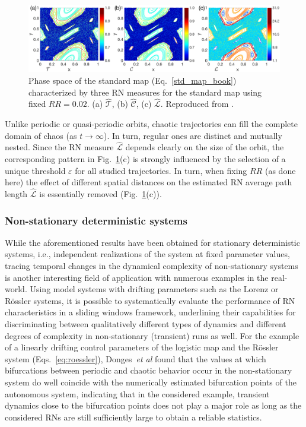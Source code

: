 \begin{figure}
	\centering
	\includegraphics[width=\columnwidth]{Chapter03_RecurrenceNt/stdFixedRRP.eps}
\caption{\small {Phase space of the standard map (Eq.~\ref{std_map_book}) characterized by three RN measures for the standard map using fixed $RR=0.02$. (a) $\hat{\mathcal{T}}$, (b) $\hat{\mathcal{C}}$, (c) $\hat{\mathcal{L}}$. Reproduced from \cite{Zou2016d}. } \label{fig:sm_rec_rr}}
\end{figure}

Unlike periodic or quasi-periodic orbits, chaotic trajectories can fill the complete domain of chaos (as $t\to\infty$). In turn, regular ones are distinct and mutually nested. Since the RN measure $\hat{\mathcal{L}}$ depends clearly on the size of the orbit, the corresponding pattern in Fig.~\ref{fig:sm_rec_rr}(c) is strongly influenced by the selection of a unique threshold $\varepsilon$ for all studied trajectories. In turn, when fixing $RR$ (as done here) the effect of different spatial distances on the estimated RN average path length $\hat{\mathcal{L}}$ is essentially removed (Fig.~\ref{fig:sm_rec_rr}(c)).


		\subsubsection{Non-stationary deterministic systems} \label{subsubsec:nonstation}
		While the aforementioned results have been obtained for stationary deterministic systems, i.e., independent realizations of the system at fixed parameter values, tracing temporal changes in the dynamical complexity of non-stationary systems is another interesting field of application with numerous examples in the real-world. Using model systems with drifting parameters such as the Lorenz \cite{Donges2011} or R\"ossler systems, it is possible to systematically evaluate the performance of RN characteristics in a sliding windows framework, underlining their capabilities for discriminating between qualitatively different types of dynamics and different degrees of complexity in non-stationary (transient) runs as well. For the example of a linearly drifting control parameters of the logistic map and the R\"ossler system (Eqs.~\eqref{eq:roessler}), Donges~{\textit{et al}} found that the values at which bifurcations between periodic and chaotic behavior occur in the non-stationary system do well coincide with the numerically estimated bifurcation points of the autonomous system, indicating that in the considered example, transient dynamics close to the bifurcation points does not play a major role as long as the considered RNs are still sufficiently large to obtain a reliable statistics.

